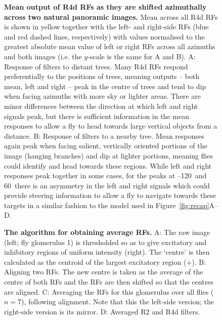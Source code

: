 \begin{figure}[htp]
	\caption{
		{\bf Mean output of R4d RFs as they are shifted azimuthally across two natural panoramic images.}
		Mean across all R4d RFs is shown in yellow together with the left- and right-side RFs (blue and red dashed lines, respectively) with values normalised to the greatest absolute mean value of left or right RFs across all azimuths and both images (i.e. the $y$-scale is the same for A and B).
		A: Response of filters to distant trees. Many R4d RFs respond preferentially to the positions of trees, meaning outputs -- both mean, left and right -- peak in the centre of trees and tend to dip when facing azimuths with more sky or lighter areas. There are minor differences between the direction at which left and right signals peak, but there is sufficient information in the mean responses to allow a fly to head towards large vertical objects from a distance.
		B: Response of filters to a nearby tree. Mean responses again peak when facing salient, vertically oriented portions of the image (hanging branches) and dip at lighter portions, meaning flies could identify and head towards these regions. While left and right responses peak together in some cases, for the peaks at --120\degree\ and 60\degree\ there is an asymmetry in the left and right signals which could provide steering information to allow a fly to navigate towards these targets in a similar fashion to the model used in Figure~\ref{fig:recap}A--D.
	}
	\label{fig:naturalstim}
\end{figure}

\begin{figure}[htp]
	\caption{
		{\bf The algorithm for obtaining average RFs.}
		A: The raw image (left; fly glomerulus 1) is thresholded so as to give excitatory and inhibitory regions of uniform intensity (right).
		The `centre' is then calculated as the centroid of the largest excitatory region (+).
		B: Aligning two RFs.
		The new centre is taken as the average of the centre of both RFs and the RFs are then shifted so that the centres are aligned.
		C: Averaging the RFs for this glomerulus over all flies ($n=7$), following alignment.
		Note that this the left-side version; the right-side version is its mirror.
		D: Averaged R2 and R4d filters.
	}
	\label{fig:avkernels}
\end{figure}

